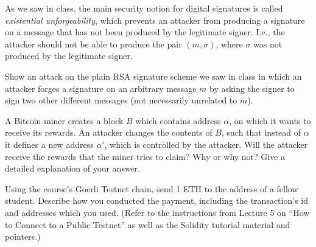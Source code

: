 \documentclass[12pt,addpoints,answers]{exam}
\begin{document}
\begin{questions}


\newpage

\question[10] As we saw in class, the main security notion for digital signatures is called {\em existential unforgeability}, which prevents an attacker from producing a signature on a message that has not been produced by the legitimate signer. I.e., the attacker should not be able to produce the pair $(m, \sigma)$, where $\sigma$ was not produced by the legitimate signer.

Show an attack on the plain RSA signature scheme we saw in class in which an attacker forges a signature on an arbitrary message $m$ by asking the signer to sign two other different messages (not necessarily unrelated to $m$).



\newpage

\question[10] A Bitcoin miner creates a block $B$ which contains address $\alpha$, on which it wants to receive its rewards. An attacker changes the contents of $B$, such that instead of $\alpha$ it defines a new address $\alpha'$, which is controlled by the attacker. Will the attacker receive the rewards that the miner tries to claim? Why or why not? Give a detailed explanation of your answer.



\newpage

\question[10] Using the course’s Goerli  Testnet chain, send 1 ETH to the address of a fellow student. Describe how you conducted the payment, including the transaction’s id and addresses which you used. (Refer to the instructions from Lecture 5 on ``How to Connect to a Public Testnet'' as well as the Solidity tutorial material and pointers.)




\end{questions}
\end{document}
